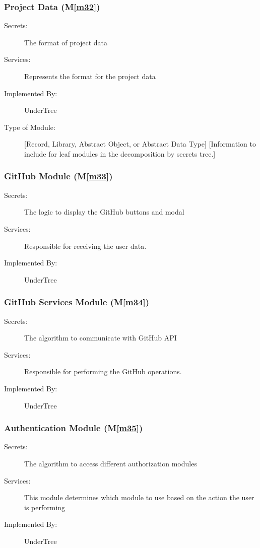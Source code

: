\documentclass[12pt, titlepage]{article}
\newcommand{\mref}[1]{M\ref{#1}}
\begin{document}
	\subsubsection{Project Data (\mref{m32})}
	
	\begin{description}
		\item[Secrets:] The format of project data
		\item[Services:] Represents the format for the project data
		\item[Implemented By:] UnderTree
		\item[Type of Module:] [Record, Library, Abstract Object, or Abstract Data Type]
		[Information to include for leaf modules in the decomposition by secrets tree.]
	\end{description}
	
	\subsubsection{GitHub Module (\mref{m33})}
	
	\begin{description}
		\item[Secrets:] The logic to display the GitHub buttons and modal
		\item[Services:] Responsible for receiving the user data.
		\item[Implemented By:] UnderTree
	\end{description}
	
	\subsubsection{GitHub Services Module (\mref{m34})}
	
	\begin{description}
		\item[Secrets:] The algorithm to communicate with GitHub API
		\item[Services:] Responsible for performing the GitHub operations.
		\item[Implemented By:] UnderTree
	\end{description}
	
	\subsubsection{Authentication Module (\mref{m35})}
	
	\begin{description}
		\item[Secrets:] The algorithm to access different authorization modules
		\item[Services:] This module determines which module to use based on the action the user is performing
		\item[Implemented By:] UnderTree
	\end{description}
	
\end{document}
